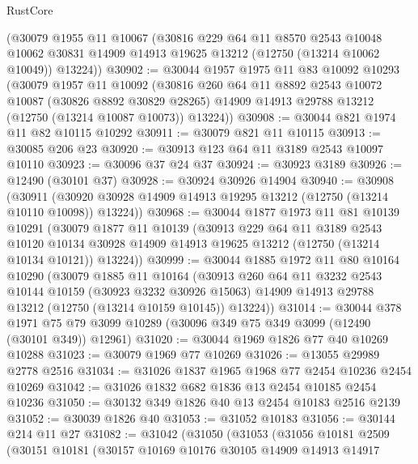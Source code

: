 \begin{lexlean}{RustCore}
\begin{coremodule}
    (@30079
      @1955
      @11
      @10067
      (@30816
        @229
        @64
        @11
        @8570
        @2543
        @10048
        @10062
        @30831
        @14909
        @14913
        @19625
        @13212
        (@12750 (@13214 @10062 @10049))
        @13224))
@30902 := @30044
    @1957
    @1975
    @11
    @83
    @10092
    @10293
    (@30079
      @1957
      @11
      @10092
      (@30816
        @260
        @64
        @11
        @8892
        @2543
        @10072
        @10087
        (@30826 @8892 @30829 @28265)
        @14909
        @14913
        @29788
        @13212
        (@12750 (@13214 @10087 @10073))
        @13224))
@30908 := @30044 @821 @1974 @11 @82 @10115 @10292
@30911 := @30079 @821 @11 @10115
@30913 := @30085 @206 @23
@30920 := @30913 @123 @64 @11 @3189 @2543 @10097 @10110
@30923 := @30096 @37 @24 @37
@30924 := @30923 @3189
@30926 := @12490 (@30101 @37)
@30928 := @30924 @30926 @14904
@30940 := @30908
    (@30911 (@30920 @30928 @14909 @14913 @19295 @13212 (@12750 (@13214 @10110 @10098)) @13224))
@30968 := @30044
    @1877
    @1973
    @11
    @81
    @10139
    @10291
    (@30079
      @1877
      @11
      @10139
      (@30913
        @229
        @64
        @11
        @3189
        @2543
        @10120
        @10134
        @30928
        @14909
        @14913
        @19625
        @13212
        (@12750 (@13214 @10134 @10121))
        @13224))
@30999 := @30044
    @1885
    @1972
    @11
    @80
    @10164
    @10290
    (@30079
      @1885
      @11
      @10164
      (@30913
        @260
        @64
        @11
        @3232
        @2543
        @10144
        @10159
        (@30923 @3232 @30926 @15063)
        @14909
        @14913
        @29788
        @13212
        (@12750 (@13214 @10159 @10145))
        @13224))
@31014 := @30044
    @378
    @1971
    @75
    @79
    @3099
    @10289
    (@30096 @349 @75 @349 @3099 (@12490 (@30101 @349)) @12961)
@31020 := @30044 @1969 @1826 @77 @40 @10269 @10288
@31023 := @30079 @1969 @77 @10269
@31026 := @13055 @29989 @2778 @2516
@31034 := @31026 @1837 @1965 @1968 @77 @2454 @10236 @2454 @10269
@31042 := @31026 @1832 @682 @1836 @13 @2454 @10185 @2454 @10236
@31050 := @30132 @349 @1826 @40 @13 @2454 @10183 @2516 @2139
@31052 := @30039 @1826 @40
@31053 := @31052 @10183
@31056 := @30144 @214 @11 @27
@31082 := @31042
    (@31050
      (@31053
        (@31056
          @10181
          @2509
          (@30151
            @10181
            (@30157
              @10169
              @10176
              @30105
              @14909
              @14913
              @14917

\end{coremodule}
\end{lexlean}
